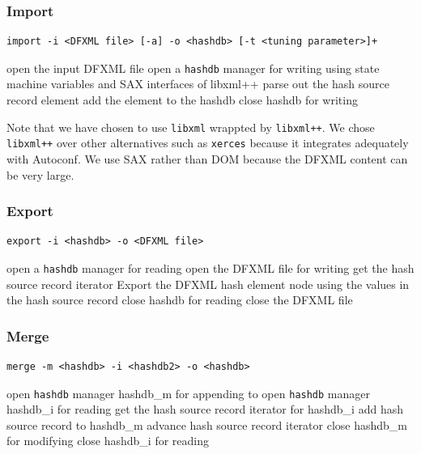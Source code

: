 \documentclass[10pt,twoside]{article}
\newcommand{\hdb}{\texttt{hashdb}\xspace}
\begin{document}
\subsubsection{Import}
\begin{small}
\begin{verbatim}
import -i <DFXML file> [-a] -o <hashdb> [-t <tuning parameter>]+
\end{verbatim}
\end{small}
\begin{algorithmic}
\STATE open the input DFXML file
\STATE open a \hdb manager for writing
\STATE using state machine variables and SAX interfaces of libxml++
  \STATE parse out the hash source record element
  \STATE add the element to the hashdb
\ENDFOR
\STATE close hashdb for writing
\end{algorithmic}

Note that we have chosen to use \texttt{libxml} wrappted by \texttt{libxml++}.
We chose \texttt{libxml++} over other alternatives such as \texttt{xerces}
because it integrates adequately with Autoconf.
We use SAX rather than DOM because the DFXML content can be very large.

\subsubsection{Export}
\begin{small}
\begin{verbatim}
export -i <hashdb> -o <DFXML file>
\end{verbatim}
\end{small}
\begin{algorithmic}
\STATE open a \hdb manager for reading
\STATE open the DFXML file for writing
\STATE get the hash source record iterator
  \STATE Export the DFXML hash element node using the values in the hash source record
\ENDFOR
\STATE close hashdb for reading
\STATE close the DFXML file
\end{algorithmic}

\subsubsection{Merge}
\begin{small}
\begin{verbatim}
merge -m <hashdb> -i <hashdb2> -o <hashdb>
\end{verbatim}
\end{small}
\begin{algorithmic}
\STATE open \hdb manager hashdb\_m for appending to
\STATE open \hdb manager hashdb\_i for reading
\STATE get the hash source record iterator for hashdb\_i
  \STATE add hash source record to hashdb\_m
  \STATE advance hash source record iterator
\ENDWHILE
\STATE close hashdb\_m for modifying
\STATE close hashdb\_i for reading
\end{algorithmic}
\end{document}
